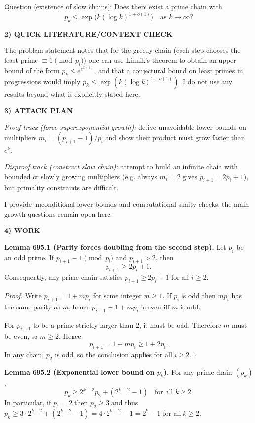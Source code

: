 Question (existence of slow chains): Does there exist a prime chain with
\[
 p_k\le \exp\big(k(\log k)^{1+o(1)}\big)\quad\text{as }k\to\infty?
\]

\bigskip
\noindent\textbf{2) QUICK LITERATURE/CONTEXT CHECK}

The problem statement notes that for the greedy chain (each step chooses the least prime $\equiv 1\pmod{p_i}$) one can use Linnik's theorem to obtain an upper bound of the form $p_k\le e^{e^{O(k)}}$, and that a conjectural bound on least primes in progressions would imply $p_k\le \exp(k(\log k)^{1+o(1)})$. I do not use any results beyond what is explicitly stated here.

\bigskip
\noindent\textbf{3) ATTACK PLAN}

\emph{Proof track (force superexponential growth):} derive unavoidable lower bounds on multipliers $m_i=(p_{i+1}-1)/p_i$ and show their product must grow faster than $c^k$.

\emph{Disproof track (construct slow chain):} attempt to build an infinite chain with bounded or slowly growing multipliers (e.g. always $m_i=2$ gives $p_{i+1}=2p_i+1$), but primality constraints are difficult.

I provide unconditional lower bounds and computational sanity checks; the main growth questions remain open here.

\bigskip
\noindent\textbf{4) WORK}

\noindent\textbf{Lemma 695.1 (Parity forces doubling from the second step).}
Let $p_i$ be an odd prime. If $p_{i+1}\equiv 1\pmod{p_i}$ and $p_{i+1}>2$, then
\[
 p_{i+1}\ge 2p_i+1.
\]
Consequently, any prime chain satisfies $p_{i+1}\ge 2p_i+1$ for all $i\ge 2$.

\smallskip
\noindent\emph{Proof.}
Write $p_{i+1}=1+m p_i$ for some integer $m\ge 1$. If $p_i$ is odd then $m p_i$ has the same parity as $m$, hence $p_{i+1}=1+m p_i$ is even iff $m$ is odd.

For $p_{i+1}$ to be a prime strictly larger than $2$, it must be odd. Therefore $m$ must be even, so $m\ge 2$. Hence
\[
 p_{i+1}=1+m p_i\ge 1+2p_i.
\]
In any chain, $p_2$ is odd, so the conclusion applies for all $i\ge 2$. \hfill$\square$

\medskip
\noindent\textbf{Lemma 695.2 (Exponential lower bound on $p_k$).}
For any prime chain $(p_k)$,
\[
 p_k\ge 2^{k-2}p_2 + (2^{k-2}-1)\quad\text{for all }k\ge 2.
\]
In particular, if $p_1=2$ then $p_2\ge 3$ and thus $p_k\ge 3\cdot 2^{k-2}+ (2^{k-2}-1)=4\cdot 2^{k-2}-1=2^{k}-1$ for all $k\ge 2$.


